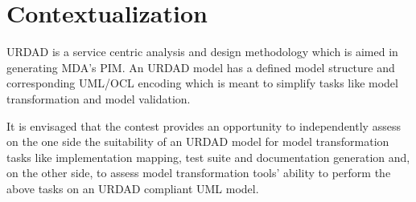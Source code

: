 \section{Contextualization}

URDAD \cite{solms_2007:technologyNeutralBpdUsingUrdad} \cite{solms_2009:generatingMdasPimUsingUrdad}
\cite{solms_2010:urdadAsSemiFormalApproach}
is a service centric analysis and design methodology which is aimed in generating MDA's PIM. An URDAD
model has a defined model structure and corresponding UML/OCL encoding which is meant to simplify
tasks like model transformation and model validation.

It is envisaged that the contest provides an opportunity to independently assess on the one side the 
suitability of an URDAD model for model transformation tasks like implementation mapping, test suite
and documentation generation and, on the other side, to assess model transformation tools' ability
to perform the above tasks on an URDAD compliant UML model.

